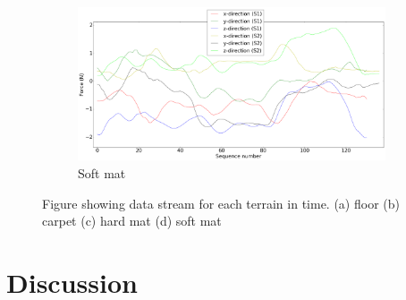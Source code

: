 \documentclass[USenglish]{ifimaster}  %
\begin{document}
		\begin{figure}[h] \ContinuedFloat
		\begin{subfigure}[b]{\textwidth}
			\includegraphics[width=\textwidth,height=\textheight,keepaspectratio]{Figures/s1mykmatte}
			\caption{Soft mat}
			\label{fig:s1mykmatte}
		\end{subfigure}
		\caption[]{Figure showing data stream for each terrain in time. (a) floor (b) carpet (c) hard mat (d) soft mat }
		\label{fig:s1all}
	\end{figure}	
	\FloatBarrier



\chapter{Discussion}
\end{document}
